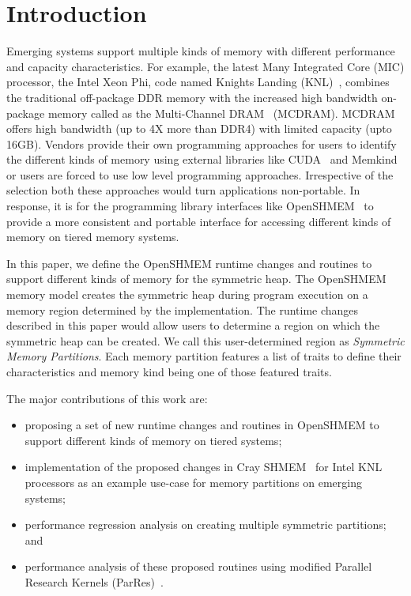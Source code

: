 \section{Introduction}
\label{src:intro}

Emerging systems support multiple kinds of memory with different
performance and capacity characteristics. For example, the latest
Many Integrated Core (MIC) processor, the Intel Xeon Phi,
code named Knights Landing (KNL)~\cite{KNL}, combines the traditional
off-package DDR memory with the increased high bandwidth on-package
memory called as the Multi-Channel DRAM~\cite{MCDRAM} (MCDRAM). MCDRAM
offers high bandwidth (up to 4X more than DDR4) with limited
capacity (upto 16GB). Vendors provide their own programming approaches
for users to identify the different kinds of memory using external
libraries like CUDA~\cite{cuda} and Memkind~\cite{memkind} or users
are forced to use low level programming approaches. Irrespective of the
selection both these approaches would turn applications non-portable.
In response, it is for the programming library interfaces like
OpenSHMEM~\cite{osm} to provide a more consistent and portable interface
for accessing different kinds of memory on tiered memory systems.

In this paper, we define the OpenSHMEM runtime changes and routines
to support different kinds of memory for the symmetric heap. The
OpenSHMEM memory model creates the symmetric heap during program
execution on a memory region determined by the implementation. The
runtime changes described in this paper would allow users to determine
a region on which the symmetric heap can be created. We call this
user-determined region as \emph{Symmetric Memory Partitions}. Each
memory partition features a list of traits to define their
characteristics and memory kind being one of those featured traits.

The major contributions of this work are:
\begin{itemize}
    \item proposing a set of new runtime changes and routines in
    OpenSHMEM to support different kinds of memory on tiered systems;
    \item implementation of the proposed changes in
    Cray SHMEM~\cite{csma} for Intel KNL processors as an example
    use-case for memory partitions on emerging systems;
    \item performance regression analysis on creating multiple symmetric
    partitions; and
    \item performance analysis of these proposed routines using
    modified Parallel Research Kernels (ParRes)~\cite{parres}.
\end{itemize}

